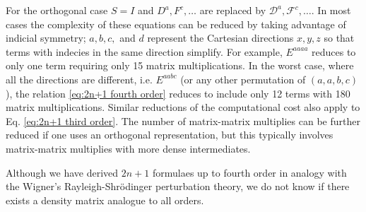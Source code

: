 \documentclass[prl,aps,preprint,showpacs,superbib]{revtex4}
\def\F{\mathcal{F}}
\def\D{\mathcal{D}}
\begin{document}
For the orthogonal case $S=I$ and $D^a,F^c,\ldots$ are replaced by $\D^a,\F^c,\ldots$.
In most cases the complexity of these equations
can be reduced by taking advantage of indicial symmetry; 
$a,b,c,$ and $d$ represent the Cartesian directions $x,y,z$
so that terms with indecies in the same direction simplify. 
For example, $E^{aaaa}$ reduces to only one term requiring only 15 matrix multiplications.
In the worst case, where all the directions are different, i.e. $E^{aabc}$ 
(or any other permutation of $(a,a,b,c)$), the relation \eqref{eq:2n+1 fourth order} 
reduces to include only 12 terms with 180 matrix multiplications. 
Similar reductions of the computational cost also apply to 
Eq. \eqref{eq:2n+1 third order}. The number of matrix-matrix multiplies can be further reduced
if one uses an orthogonal representation, but this typically involves matrix-matrix multiplies 
with more dense intermediates.

Although we have derived $2n+1$ formulaes up to fourth order in analogy with 
the Wigner's Rayleigh-Shr\"odinger perturbation theory, we do not know if there exists a
density matrix analogue to all orders. 
\end{document}

